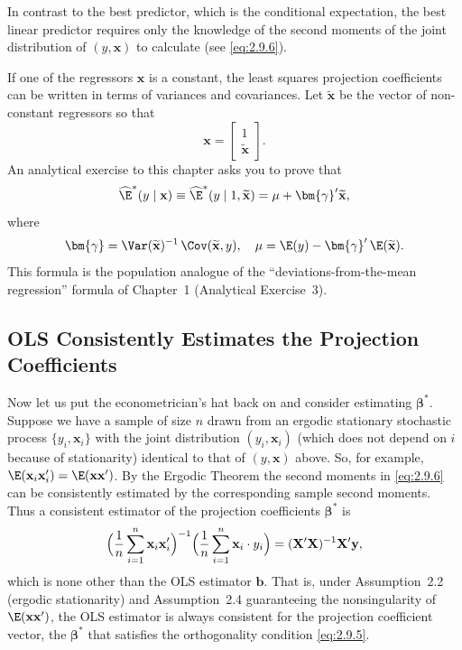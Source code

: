 In contrast to the best predictor, which is the conditional expectation, the best linear
predictor requires only the knowledge of the second moments of the joint distribution of $(y, \mathbf{x})$ to calculate (see \eqref{eq:2.9.6}).

If one of the regressors $\mathbf{x}$ is a constant, the least squares projection coefficients
can be written in terms of variances and covariances. Let $\widetilde{\mathbf{x}}$ be the vector of non-constant regressors so that
%
\[
\mathbf{x} = \begin{bmatrix} 1 \\ \widetilde{\mathbf{x}} \end{bmatrix}.
\]
%
An analytical exercise to this chapter asks you to prove that
%
\begin{equation}
\widehat{\E}^*(y \mid \mathbf{x})
\equiv \widehat{\E}^*(y \mid 1, \widetilde{\mathbf{x}})
= \mu + \bm{\gamma}'\widetilde{\mathbf{x}},
\label{eq:2.9.7}
\end{equation}
%
where
\[
\bm{\gamma} = \Var(\widetilde{\mathbf{x}})^{-1}\,\Cov(\widetilde{\mathbf{x}}, y),
\quad
\mu = \E(y) - \bm{\gamma}'\,\E(\widetilde{\mathbf{x}}).
\]
%
This formula is the population analogue of the ``deviations-from-the-mean regression'' formula of Chapter~1 (Analytical Exercise~3).

\subsection*{OLS Consistently Estimates the Projection Coefficients}

Now let us put the econometrician's hat back on and consider estimating $\bm{\beta}^*$.
Suppose we have a sample of size $n$ drawn from an ergodic stationary stochastic
process $\{y_i, \mathbf{x}_i\}$ with the joint distribution $(y_i, \mathbf{x}_i)$ (which does not depend on $i$
because of stationarity) identical to that of $(y, \mathbf{x})$ above. So, for example,
$\E(\mathbf{x}_i\mathbf{x}_i') = \E(\mathbf{x}\mathbf{x}')$.
By the Ergodic Theorem the second moments in \eqref{eq:2.9.6} can be consistently estimated by the corresponding sample second moments. Thus a consistent estimator
of the projection coefficients $\bm{\beta}^*$ is
%
\[
\Bigl(\frac{1}{n}\sum_{i=1}^{n}\mathbf{x}_i\mathbf{x}_i'\Bigr)^{-1}
\Bigl(\frac{1}{n}\sum_{i=1}^{n}\mathbf{x}_i \cdot y_i\Bigr)
= (\mathbf{X}'\mathbf{X})^{-1}\mathbf{X}'\mathbf{y},
\]
%
which is none other than the OLS estimator $\mathbf{b}$. That is, under Assumption~2.2
(ergodic stationarity) and Assumption~2.4 guaranteeing the nonsingularity of
$\E(\mathbf{x}\mathbf{x}')$, the OLS estimator is always consistent for the projection coefficient vector,
the $\bm{\beta}^*$ that satisfies the orthogonality condition \eqref{eq:2.9.5}.

